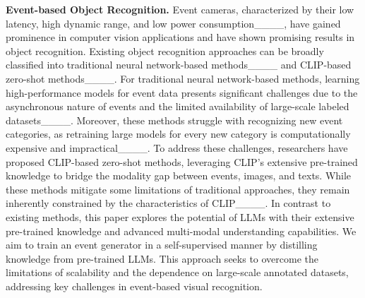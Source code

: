 \noindent \textbf{Event-based Object Recognition.} Event cameras, characterized by their low latency, high dynamic range, and low power consumption____, have gained prominence in computer vision applications and have shown promising results in object recognition. Existing object recognition approaches can be broadly classified into traditional neural network-based methods____ and CLIP-based zero-shot methods____. For traditional neural network-based methods, learning high-performance models for event data presents significant challenges due to the asynchronous nature of events and the limited availability of large-scale labeled datasets____. Moreover, these methods struggle with recognizing new event categories, as retraining large models for every new category is computationally expensive and impractical____. To address these challenges, researchers have proposed CLIP-based zero-shot methods, leveraging CLIP’s extensive pre-trained knowledge to bridge the modality gap between events, images, and texts. While these methods mitigate some limitations of traditional approaches, they remain inherently constrained by the characteristics of CLIP____. In contrast to existing methods, this paper explores the potential of LLMs with their extensive pre-trained knowledge and advanced multi-modal understanding capabilities. We aim to train an event generator in a self-supervised manner by distilling knowledge from pre-trained LLMs. This approach seeks to overcome the limitations of scalability and the dependence on large-scale annotated datasets, addressing key challenges in event-based visual recognition.